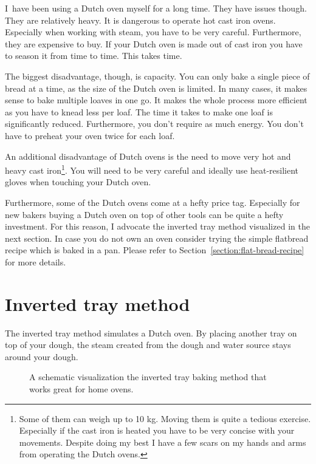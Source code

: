 I~have been using a Dutch oven myself for a long time. They
have issues though. They are relatively heavy. It is dangerous
to operate hot cast iron ovens. Especially when working with steam,
you have to be very careful. Furthermore,
they are expensive to buy. If your Dutch oven is made out
of cast iron you have to season it from time to time. This takes
time.

The biggest disadvantage, though, is
capacity. You can only bake a single piece of bread at a time,
as the size of the Dutch oven is limited.
In many cases, it makes sense to bake multiple
loaves in one go. It makes the whole process more
efficient as you have to knead less per loaf. The time it
takes to make one loaf is significantly reduced. Furthermore,
you don't require as much energy. You don't have
to preheat your oven twice for each loaf.

An additional disadvantage of Dutch ovens is the
need to move very hot and heavy cast iron\footnote{%
  Some of them can weigh up to 10 kg. Moving them is quite
  a tedious exercise. Especially if the cast iron is
  heated you have to be very concise with your movements.
  Despite doing my best I have a few scars on my
  hands and arms from operating the Dutch ovens.
}.
You will need to be very careful and ideally use
heat-resilient gloves when touching your Dutch oven.

Furthermore, some of the Dutch ovens come at a hefty
price tag. Especially for new bakers buying a Dutch oven on
top of other tools can be quite a hefty investment. For
this reason, I advocate the inverted tray method visualized
in the next section. In case you do not own an oven consider trying
the simple flatbread recipe which is baked in a pan. Please
refer to Section~\ref{section:flat-bread-recipe} for more details.


\section{Inverted tray method}

The inverted tray method simulates a Dutch oven.
By placing another tray on top of your dough, the steam
created from the dough and water source stays
around your dough.

\begin{figure}[!htb]
\begin{center}
  
  \caption[Inverted tray baking process]{A schematic visualization the
  inverted tray baking method that works great for home ovens.}%
  \label{fig:inverted-tray-process}
\end{center}
\end{figure}


